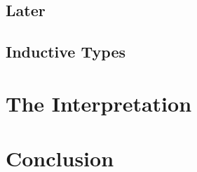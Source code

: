 \documentclass[a4paper,UKenglish,cleveref, autoref,numberwithinsect]{lipics-v2019}
\begin{document}
\subsection{Later}




\subsection{Inductive Types}


\section{The Interpretation}


\section{Conclusion}




\end{document}
